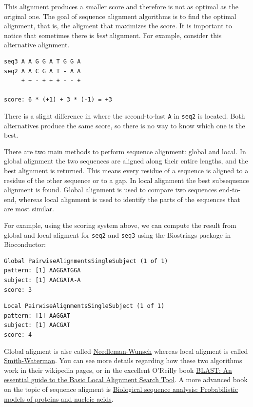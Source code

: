 \documentclass[]{book}
\theoremstyle{definition}
\theoremstyle{definition}
\theoremstyle{definition}
\theoremstyle{remark}
\begin{document}
This alignment produces a smaller score and therefore is not as optimal
as the original one. The goal of sequence alignment algorithms is to
find the optimal alignment, that is, the aligment that maximizes the
score. It is important to notice that sometimes there is \emph{best}
alignment. For example, consider this alternative alignment.

\begin{verbatim}
seq3 A A G G A T G G A
seq2 A A C G A T - A A
     + + - + + + - - +

score: 6 * (+1) + 3 * (-1) = +3
\end{verbatim}

There is a slight difference in where the second-to-last \texttt{A} in
\texttt{seq2} is located. Both alternatives produce the same score, so
there is no way to know which one is the best.

There are two main methods to perform sequence alignment: global and
local. In global alignment the two sequences are aligned along their
entire lengths, and the best alignment is returned. This means every
residue of a sequence is aligned to a residue of the other sequence or
to a gap. In local alignment the best subsequence alignment is found.
Global alignment is used to compare two sequences end-to-end, whereas
local alignment is used to identify the parts of the sequences that are
most similar.

For example, using the scoring system above, we can compute the result
from global and local aligment for \texttt{seq2} and \texttt{seq3} using
the Biostrings package in Bioconductor:

\begin{verbatim}
Global PairwiseAlignmentsSingleSubject (1 of 1)
pattern: [1] AAGGATGGA 
subject: [1] AACGATA-A 
score: 3 
\end{verbatim}

\begin{verbatim}
Local PairwiseAlignmentsSingleSubject (1 of 1)
pattern: [1] AAGGAT 
subject: [1] AACGAT 
score: 4 
\end{verbatim}

Global aligment is alse called
\href{https://en.wikipedia.org/wiki/Needleman–Wunsch_algorithm}{Needleman-Wunsch}
whereas local aligment is called
\href{https://en.wikipedia.org/wiki/Smith–Waterman_algorithm}{Smith-Waterman}.
You can see more details regarding how these two algorithms work in
their wikipedia pages, or in the excellent O'Reilly book
\protect\hyperlink{blast-an-essential-guide-to-the-basic-local-alignment-search-tool}{BLAST:
An essential guide to the Basic Local Alignment Search Tool}. A more
advanced book on the topic of sequence aligment is
\protect\hyperlink{biological-sequence-analysis-probabilistic-models-of-proteins-and-nucleic-acids}{Biological
sequence analysis: Probabilistic models of proteins and nucleic acids}.
\end{document}
